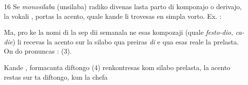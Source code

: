 \begin{VUpage}[20]{16}
Se \textit{monosilaba} (unsilaba) radiko divenas lasta parto di\nl
kompozajo o derivajo, la vokali ,  portas la acento, quale\nl
kande li trovesas en simpla vorto. Ex. : \cc
{}

Ma, pro ke la nomi di la sep dii semanala ne esas kompozaji\nl
(quale \textit{festo-dio, ca-die}) li recevas la acento sur la silabo qua\nl
preiras \textit{di} e qua esas reale la prelasta. On do pronuncas :\nl
{} (3).

Kande ,  formacanta diftongo (4) renkontresas kom\nl
silabo prelasta, la acento restas sur ta diftongo, kun la chefa
\parplein
\end{VUpage}

